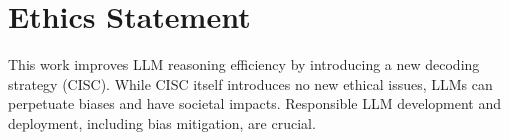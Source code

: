 



\section{Ethics Statement}

This work improves LLM reasoning efficiency by introducing a new decoding strategy (CISC). While CISC itself introduces no new ethical issues, LLMs can perpetuate biases and have societal impacts. Responsible LLM development and deployment, including bias mitigation, are crucial. 
